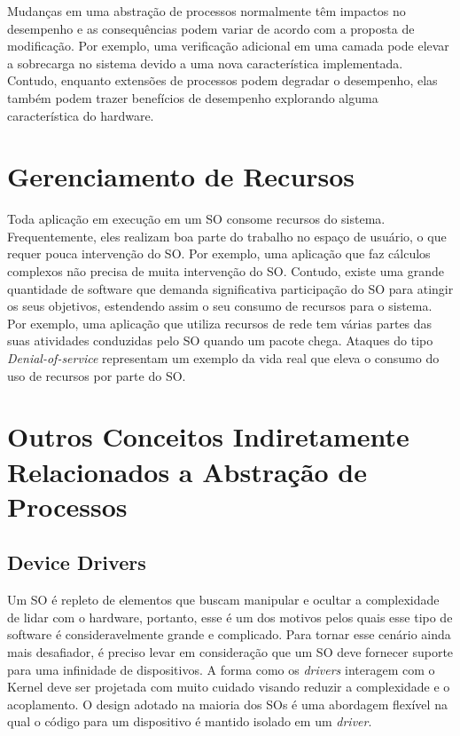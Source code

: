 Mudanças em uma abstração de processos normalmente têm impactos no desempenho e
as consequências podem variar de acordo com a proposta de modificação. Por
exemplo, uma verificação adicional em uma camada pode elevar a sobrecarga no
sistema devido a uma nova característica implementada. Contudo, enquanto
extensões de processos podem degradar o desempenho, elas também podem trazer
benefícios de desempenho explorando alguma característica do hardware.

\section{Gerenciamento de Recursos}

Toda aplicação em execução em um SO consome recursos do sistema.
Frequentemente, eles realizam boa parte do trabalho no espaço de usuário, o que
requer pouca intervenção do SO. Por exemplo, uma aplicação que faz cálculos
complexos não precisa de muita intervenção do SO. Contudo, existe uma grande
quantidade de software que demanda significativa participação do SO para
atingir os seus objetivos, estendendo assim o seu consumo de recursos para o
sistema. Por exemplo, uma aplicação que utiliza recursos de rede tem várias
partes das suas atividades conduzidas pelo SO quando um pacote chega.  Ataques do tipo
\emph{Denial-of-service} representam um exemplo da vida real que eleva o
consumo do uso de recursos por parte do SO.


\section{Outros Conceitos Indiretamente Relacionados a Abstração de Processos}


\subsection{Device Drivers}
\label{sec:dd}

Um SO é repleto de elementos que buscam manipular e ocultar a complexidade de
lidar com o hardware, portanto, esse é um dos motivos pelos quais esse tipo de
software é consideravelmente grande e complicado. Para tornar esse cenário
ainda mais desafiador, é preciso levar em consideração que um SO deve fornecer
suporte para uma infinidade de dispositivos. A forma como os \emph{drivers}
interagem com o Kernel deve ser projetada com muito cuidado visando reduzir a
complexidade e o acoplamento. O design adotado na maioria dos SOs é uma
abordagem flexível na qual o código para um dispositivo é mantido isolado em um
\emph{driver}.

